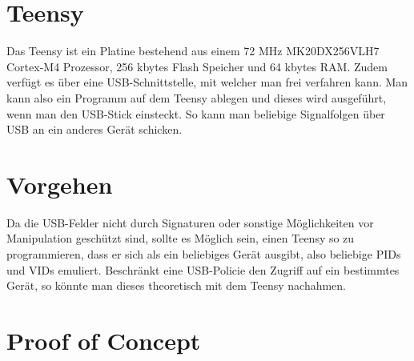 \section{Teensy}
Das Teensy ist ein Platine bestehend aus einem 72 MHz MK20DX256VLH7 Cortex-M4 Prozessor, 256 kbytes Flash Speicher und 64 kbytes RAM. Zudem verfügt es über eine USB-Schnittstelle, mit welcher man frei verfahren kann. Man kann also ein Programm auf dem Teensy ablegen und dieses wird ausgeführt, wenn man den USB-Stick einsteckt. So kann man beliebige Signalfolgen über USB an ein anderes Gerät schicken.
			
\section{Vorgehen}
Da die USB-Felder nicht durch Signaturen oder sonstige Möglichkeiten vor Manipulation geschützt sind, sollte es Möglich sein, einen Teensy so zu programmieren, dass er sich als ein beliebiges Gerät ausgibt, also beliebige PIDs und VIDs emuliert. Beschränkt eine USB-Policie den Zugriff auf ein bestimmtes Gerät, so könnte man dieses theoretisch mit dem Teensy nachahmen.

\section{Proof of Concept} \label{PoC}